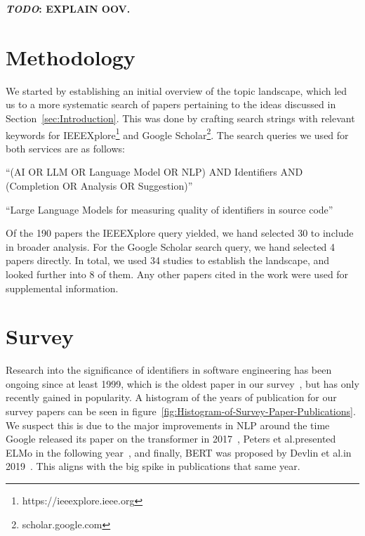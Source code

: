 \documentclass[conference]{IEEEtran}
\newcommand{\TODO}[1]{\textbf{\textcolor{Bittersweet}{#1}}\xspace}
\newcommand{\TODOM}[1]{\TODO{\emph{TODO}: #1}\xspace}
\begin{document}
\TODOM{EXPLAIN OOV.}


\section{Methodology}
\label{sec:Methodology}

We started by establishing an initial overview of the topic landscape, which led us to a
more systematic search of papers pertaining to the ideas discussed in
Section~\ref{sec:Introduction}. This was done by crafting search strings with relevant
keywords for IEEEXplore\footnote{https://ieeexplore.ieee.org} and Google
Scholar\footnote{scholar.google.com}. The search queries we used for both services are as
follows:

\begin{description}
    \item[IEEEXplore:]

    ``(AI OR LLM OR Language Model OR NLP) AND Identifiers AND (Completion OR Analysis OR
    Suggestion)''

    \item[Google Scholar:]

    ``Large Language Models for measuring quality of identifiers in source code''
\end{description}

Of the 190 papers the IEEEXplore query yielded, we hand selected 30 to include in broader
analysis. For the Google Scholar search query, we hand selected 4 papers directly. In
total, we used 34 studies to establish the landscape, and looked further into 8 of them.
Any other papers cited in the work were used for supplemental information.


\section{Survey}
\label{sec:Survey}

Research into the significance of identifiers in software engineering has been ongoing
since at least 1999, which is the oldest paper in our survey~\cite{Antoniol1999OO}, but
has only recently gained in popularity. A histogram of the years of publication for our
survey papers can be seen in figure~\ref{fig:Histogram-of-Survey-Paper-Publications}. We
suspect this is due to the major improvements in NLP around the time Google released its
paper on the transformer in 2017~\cite{Ashish2017Transformer}, Peters et al.\@ presented
ELMo in the following year~\cite{Peters2018DeepCW}, and finally, BERT was proposed by
Devlin et al.\@ in 2019~\cite{Devlin2019BERT}. This aligns with the big spike in
publications that same year.
\end{document}
